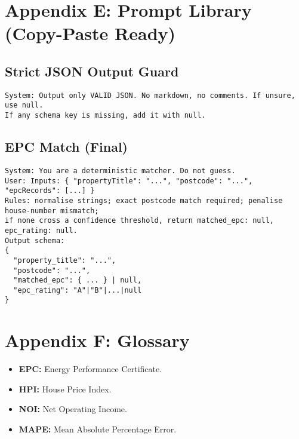 \documentclass[12pt,a4paper]{article}
\begin{document}
\section*{Appendix E: Prompt Library (Copy-Paste Ready)}
\subsection*{Strict JSON Output Guard}
\begin{lstlisting}
System: Output only VALID JSON. No markdown, no comments. If unsure, use null.
If any schema key is missing, add it with null.
\end{lstlisting}

\subsection*{EPC Match (Final)}
\begin{lstlisting}
System: You are a deterministic matcher. Do not guess.
User: Inputs: { "propertyTitle": "...", "postcode": "...", "epcRecords": [...] }
Rules: normalise strings; exact postcode match required; penalise house-number mismatch;
if none cross a confidence threshold, return matched_epc: null, epc_rating: null.
Output schema:
{
  "property_title": "...",
  "postcode": "...",
  "matched_epc": { ... } | null,
  "epc_rating": "A"|"B"|...|null
}
\end{lstlisting}

\section*{Appendix F: Glossary}
\begin{itemize}[leftmargin=1.5em]
  \item \textbf{EPC:} Energy Performance Certificate.
  \item \textbf{HPI:} House Price Index.
  \item \textbf{NOI:} Net Operating Income.
  \item \textbf{MAPE:} Mean Absolute Percentage Error.
\end{itemize}
\end{document}
